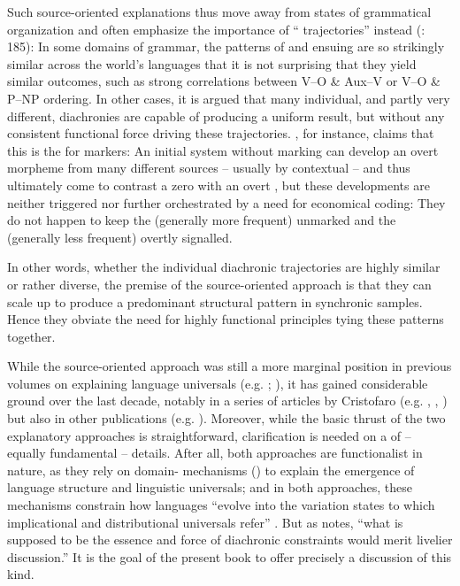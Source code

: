 \documentclass[output=paper]{langsci/langscibook}
\begin{document}
Such source-oriented explanations thus move away from  states of grammatical organization and often emphasize the importance of “ trajectories” instead (\citealt{BybeeBeckner2015}: 185): In some domains of grammar, the patterns of  and ensuing  are so strikingly similar across the world’s languages that it is not surprising that they yield similar outcomes, such as strong correlations between V–O \& Aux–V or V–O \& P–NP ordering. In other cases, it is argued that many individual, and partly very different, diachronies are capable of producing a uniform result, but without any consistent functional force driving these trajectories. \citet{Cristofaro2017}, for instance, claims that this is the  for  markers: An initial system without  marking can develop an overt  morpheme from many different sources – usually by contextual  – and thus ultimately come to contrast a zero  with an overt , but these developments are neither triggered nor further orchestrated by a need for economical coding: They do not happen to keep the (generally more frequent)  unmarked and the (generally less frequent)  overtly signalled. 

In other words, whether the individual diachronic trajectories are highly similar or rather diverse, the premise of the source-oriented approach is that they can scale up to produce a predominant structural pattern in synchronic samples. Hence they obviate the need for highly  functional principles tying these patterns together.

While the source-oriented approach was still a more marginal position in previous volumes on explaining language universals (e.g. \citealt{Hawkins1988_ExplEd}; \citealt{Good2008_Change}), it has gained considerable ground over the last decade, notably in a series of articles by Cristofaro (e.g. \citealt{Cristofaro2012}, \citealt{Cristofaro2014}, \citealt{Cristofaro2017}) but also in other publications (e.g. \citealt{Anderson2016,Creissels2008,GildeaZúñiga2016}). Moreover, while the basic thrust of the two explanatory approaches is straightforward, clarification is needed on a  of – equally fundamental – details. After all, both approaches are functionalist in nature, as they rely on domain- mechanisms (\citealt{Bybee2010}) to explain the emergence of language structure and linguistic universals; and in both approaches, these mechanisms constrain how languages “evolve into the variation states to which implicational and distributional universals refer” \citep[18]{Hawkins1988_Intro}. But as \citet[51]{Plank2007} notes, “what is supposed to be the essence and force of diachronic constraints would merit livelier discussion.” It is the goal of the present book to offer precisely a discussion of this kind.
\end{document}
